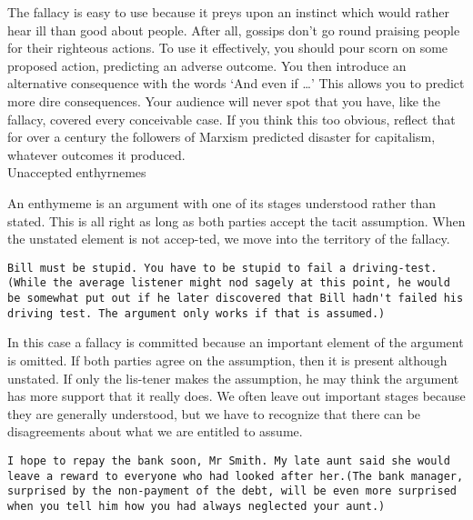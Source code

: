 \documentclass[a4paper,12pt,single,pdftex]{scrartcl}
\begin{document}
      The fallacy is easy to use because it preys upon an instinct which would rather hear ill than good about people. After all, gossips don’t go round praising people for their righteous actions. To use it effectively, you should pour scorn on some proposed action, predicting an adverse outcome. You then introduce an alternative consequence with the words ‘And even if …’ This allows you to predict more dire consequences. Your audience will never spot that you have, like the fallacy, covered every conceivable case. If you think this too obvious, reflect that for over a century the followers of Marxism predicted disaster for capitalism, whatever outcomes it produced.
    \\

  

Unaccepted enthyrnemes
    
      An enthymeme is an argument with one of its stages understood rather than stated. This is all right as long as both parties accept the tacit assumption. When the unstated element is not accep-ted, we move into the territory of the fallacy.
    \\

    \begin{verbatim}Bill must be stupid. You have to be stupid to fail a driving-test.(While the average listener might nod sagely at this point, he would be somewhat put out if he later discovered that Bill hadn't failed his driving test. The argument only works if that is assumed.)\end{verbatim}
    
      In this case a fallacy is committed because an important element of the argument is omitted. If both parties agree on the assumption, then it is present although unstated. If only the lis-tener makes the assumption, he may think the argument has more support that it really does. We often leave out important stages because they are generally understood, but we have to recognize that there can be disagreements about what we are entitled to assume.
    \\

    \begin{verbatim}I hope to repay the bank soon, Mr Smith. My late aunt said she would leave a reward to everyone who had looked after her.(The bank manager, surprised by the non-payment of the debt, will be even more surprised when you tell him how you had always neglected your aunt.)\end{verbatim}
    
\end{document}

